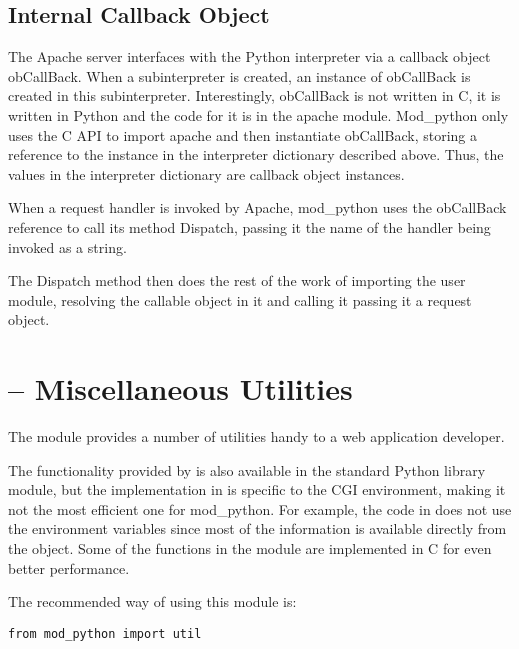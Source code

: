 \subsection{Internal Callback Object\label{pyapi-callback}}

The Apache server interfaces with the Python interpreter via a
callback object obCallBack. When a subinterpreter is created, an
instance of obCallBack is created in this
subinterpreter. Interestingly, obCallBack is not written in C, it is
written in Python and the code for it is in the apache module.
Mod_python only uses the C API to import apache and then instantiate
obCallBack, storing a reference to the instance in the interpreter
dictionary described above. Thus, the values in the interpreter
dictionary are callback object instances.

When a request handler is invoked by Apache, mod_python uses the
obCallBack reference to call its method Dispatch, passing it the name
of the handler being invoked as a string.
            
The Dispatch method then does the rest of the work of importing the
user module, resolving the callable object in it and calling it
passing it a request object.

\section{ -- Miscellaneous Utilities\label{pyapi-util}}

The  module provides a number of utilities handy to a 
web application developer. 

The functionality provided by  is also available in the
standard Python library  module, but the
implementation in  is specific to the CGI environment,
making it not the most efficient one for mod_python. For example, the
code in  does not use the environment variables since
most of the information is available directly from the
 object. Some of the functions in the 
module are implemented in C for even better performance.

The recommended way of using this module is:
\begin{verbatim}
from mod_python import util
\end{verbatim}

